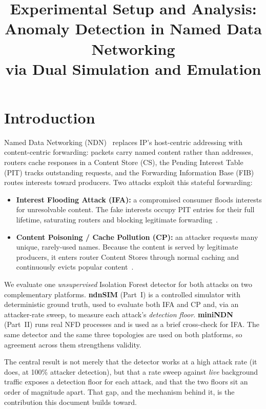 \documentclass[11pt,a4paper]{article}
\title{Experimental Setup and Analysis:\\
Anomaly Detection in Named Data Networking\\
via Dual Simulation and Emulation}
\author{}
\date{}
\begin{document}
\maketitle

\section{Introduction}

Named Data Networking (NDN)~\cite{ndn-arch} replaces IP's host-centric addressing with content-centric forwarding: packets carry named content rather than addresses, routers cache responses in a Content Store (CS), the Pending Interest Table (PIT) tracks outstanding requests, and the Forwarding Information Base (FIB) routes interests toward producers. Two attacks exploit this stateful forwarding:

\begin{itemize}[noitemsep]
  \item \textbf{Interest Flooding Attack (IFA):} a compromised consumer floods interests for unresolvable content. The fake interests occupy PIT entries for their full lifetime, saturating routers and blocking legitimate forwarding~\cite{ifa-survey}.
  \item \textbf{Content Poisoning / Cache Pollution (CP):} an attacker requests many unique, rarely-used names. Because the content is served by legitimate producers, it enters router Content Stores through normal caching and continuously evicts popular content~\cite{cp-attack}.
\end{itemize}

We evaluate one \emph{unsupervised} Isolation Forest detector for both attacks on two complementary platforms. \textbf{ndnSIM} (Part~I) is a controlled simulator with deterministic ground truth, used to evaluate both IFA and CP and, via an attacker-rate sweep, to measure each attack's \emph{detection floor}. \textbf{miniNDN} (Part~II) runs real NFD processes and is used as a brief cross-check for IFA. The same detector and the same three topologies are used on both platforms, so agreement across them strengthens validity.

The central result is not merely that the detector works at a high attack rate (it does, at 100\% attacker detection), but that a rate sweep against \emph{live} background traffic exposes a detection floor for each attack, and that the two floors sit an order of magnitude apart. That gap, and the mechanism behind it, is the contribution this document builds toward.
\end{document}
